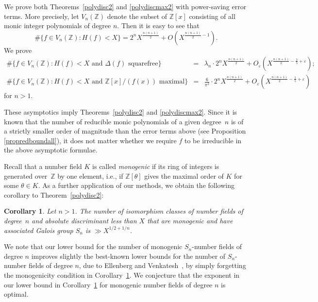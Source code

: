 \documentclass[11pt]{article}
\def\Z{{\mathbb Z}}
\def\Vmn{{V_n}}
\def\Z{{\mathbb Z}}
\newtheorem{corollary}[theorem]{Corollary}
\begin{document}
We prove both Theorems~\ref{polydisc2} and \ref{polydiscmax2} with
power-saving error terms. More precisely, let $\Vmn(\Z)$ denote
the subset of $\Z[x]$ consisting of all monic integer polynomials of
degree $n$.  Then it is easy to see that
\begin{equation*}
{\#\{f\in \Vmn(\Z):  H(f)<X \}} = 2^nX^{\frac{\scriptstyle n(n+1)}{\scriptstyle2}} + O(X^{\frac{\scriptstyle n(n+1)}{\scriptstyle2}-{ 1}}).
\end{equation*}
We prove
\begin{equation}\label{errorterms}
{\begin{array}{ccl}
\displaystyle
{\#\{f\in \Vmn(\Z) : H(f)<X \mbox{ and $\Delta(f)$ squarefree}\}}
&\!\!=\!\!&  \lambda_n\cdot 2^n{X^\frac{\scriptstyle n(n+1)}{\scriptstyle2}} + O_\varepsilon(X^{\frac{\scriptstyle n(n+1)}{\scriptstyle2}-{\textstyle \frac15}+\varepsilon});\\[.15in]
\displaystyle
{\#\{f\in \Vmn(\Z) : H(f)<X \mbox{ and $\Z[x]/(f(x))$ maximal}\}}&\!\!=\!\!&  {\displaystyle\frac{6}{\pi^2}}\cdot 2^nX^{\frac{\scriptstyle n(n+1)}{\scriptstyle2}} + O_\varepsilon(X^{\frac{\scriptstyle n(n+1)}{\scriptstyle2}-{\textstyle \frac15}+\varepsilon})
\end{array}}
\end{equation}
for $n>1$.

These asymptotics imply Theorems~\ref{polydisc2} and
\ref{polydiscmax2}.  Since it is known that the number of reducible
monic polynomials of a given degree~$n$ is of a strictly smaller order
of magnitude than the error terms above (see Proposition
\ref{propredboundall}), it does not matter whether we require $f$ to
be irreducible in the above asymptotic formulae.

Recall that a number field $K$ is called {\it monogenic} if its ring
of integers is generated over~$\Z$ by one element, i.e., if
$\Z[\theta]$ gives the maximal order of $K$ for some $\theta\in K$.
As a further application of our methods, we obtain the following
corollary to Theorem~\ref{polydisc2}:

\begin{corollary}\label{monogenic}
Let $n>1$.  The number of isomorphism classes of number fields
of degree~$n$ and absolute discriminant less than $X$ that are
monogenic and have associated Galois group $S_n$ is $\gg X^{1/2+1/n}$.
\end{corollary}
We note that our lower bound for the number of monogenic $S_n$-number
fields of degree $n$ improves slightly the best-known lower bounds for
the number of $S_n$-number fields of degree $n$, due to Ellenberg and
Venkatesh~\cite[Theorem 1.1]{EV}, by simply forgetting the
monogenicity condition in Corollary~\ref{monogenic}.  We conjecture
that the exponent in our lower bound in Corollary~\ref{monogenic} for
monogenic number fields of degree $n$ is optimal.
\end{document}
